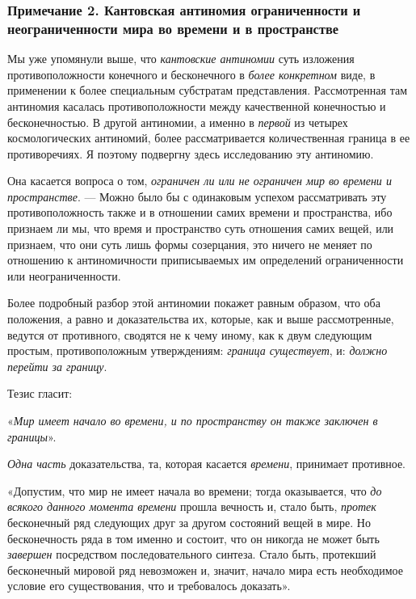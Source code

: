 \subsubsection[Примечание 2. Кантовская антиномия ограниченности и неограниченности мира во времени и в пространстве]
{Примечание 2. Кантовская антиномия ограниченности и неограниченности мира во времени и в пространстве}

Мы уже упомянули выше, что {\em кантовские антиномии}
суть изложения противоположности конечного и бесконечного в
{\em более конкретном} виде, в применении к более
специальным субстратам представления. Рассмотренная там антиномия касалась
противоположности между качественной конечностью и бесконечностью. В другой
антиномии, а именно в {\em первой} из четырех
космологических антиномий, более рассматривается количественная граница в
ее противоречиях. Я поэтому подвергну здесь исследованию эту антиномию.

Она касается вопроса о том, {\em ограничен ли или не
ограничен мир во времени и пространстве}. — Можно было бы с одинаковым
успехом рассматривать эту противоположность также и в отношении самих
времени и пространства, ибо признаем ли мы, что время и пространство суть
отношения самих вещей, или признаем, что они суть лишь формы созерцания,
это ничего не меняет по отношению к антиномичности приписываемых им
определений ограниченности или неограниченности.

Более подробный разбор этой антиномии покажет равным образом, что оба
положения, а равно и доказательства их, которые, как и выше рассмотренные,
ведутся от противного, сводятся не к чему иному, как к двум следующим
простым, противоположным утверждениям: {\em граница
существует}, и: {\em должно перейти за границу}.

Тезис гласит:

«{\em Мир имеет начало во времени, и по пространству он
также заключен в границы}».

{\em Одна часть} доказательства, та, которая касается
{\em времени}, принимает противное.

«Допустим, что мир не имеет начала во времени; тогда оказывается, что
{\em до всякого данного момента времени} прошла
вечность и, стало быть, {\em протек} бесконечный ряд
следующих друг за другом состояний вещей в мире. Но бесконечность ряда в
том именно и состоит, что он никогда не может быть
{\em завершен} посредством последовательного синтеза.
Стало быть, протекший бесконечный мировой ряд невозможен и, значит, начало
мира есть необходимое условие его существования, что и требовалось
доказать».

